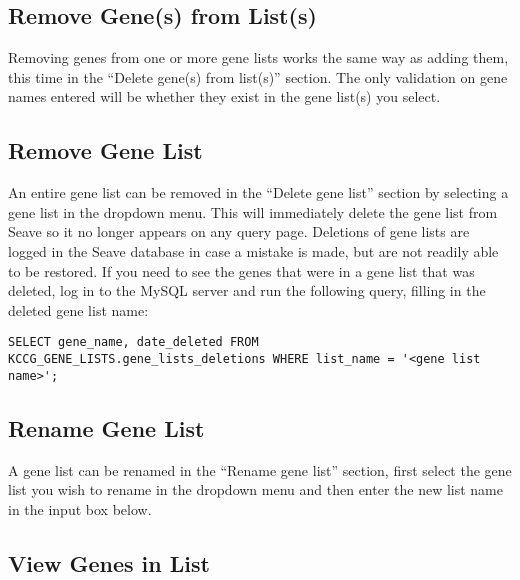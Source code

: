 \documentclass[11pt, a4paper]{article}
\begin{document}

\subsection{Remove Gene(s) from List(s)}

Removing genes from one or more gene lists works the same way as adding them, this time in the ``Delete gene(s) from list(s)'' section. The only validation on gene names entered will be whether they exist in the gene list(s) you select.


\subsection{Remove Gene List}

An entire gene list can be removed in the ``Delete gene list'' section by selecting a gene list in the dropdown menu. This will immediately delete the gene list from Seave so it no longer appears on any query page. Deletions of gene lists are logged in the Seave database in case a mistake is made, but are not readily able to be restored. If you need to see the genes that were in a gene list that was deleted, log in to the MySQL server and run the following query, filling in the deleted gene list name:

\begin{lstlisting}
SELECT gene_name, date_deleted FROM KCCG_GENE_LISTS.gene_lists_deletions WHERE list_name = '<gene list name>';
\end{lstlisting}


\subsection{Rename Gene List}

A gene list can be renamed in the ``Rename gene list'' section, first select the gene list you wish to rename in the dropdown menu and then enter the new list name in the input box below.


\subsection{View Genes in List}
\end{document}
